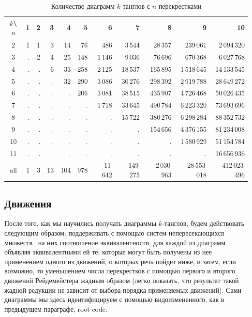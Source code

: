 \documentclass[12pt]{article}
\theoremstyle{plain}
\theoremstyle{definition}
\def\RC{\hbox{root-code}}
\begin{document}
		\begin{table}[ht]
			\caption{Количество диаграмм $k$-танглов с $n$ перекрестками\label{table:tangle-diagrams}}
			\centering
			\begin{tabular}{|c||r|r|r|r|r|r|r|r|r|r|}
			\hline
			$k$\textbackslash $n$
			    & 1 & 2 &  3 &   4 &   5 &       6 &        7 &           8 &            9 &            10 \\
			\hline\hline
			2   & 1 & 1 &  3 &  14 &  76 &     486 &   3\,544 &     28\,357 &     239\,061 &   2\,094\,320 \\
			3   & . & 2 &  4 &  25 & 148 &  1\,146 &   9\,036 &     76\,696 &     670\,368 &   6\,027\,768 \\
			4   & . & . &  6 &  33 & 258 &  2\,125 &  18\,537 &    165\,895 &  1\,518\,645 &  14\,133\,545 \\
			5   & . & . &  . &  32 & 290 &  3\,086 &  30\,276 &    298\,392 &  2\,919\,788 &  28\,649\,272 \\
			6   & . & . &  . &   . & 206 &  3\,081 &  38\,515 &    435\,907 &  4\,726\,468 &  50\,026\,435 \\
			7   & . & . &  . &   . &   . &  1\,718 &  33\,645 &    490\,784 &  6\,223\,320 &  73\,693\,696 \\
			8   & . & . &  . &   . &   . &       . &  15\,722 &    380\,276 &  6\,298\,284 &  88\,352\,732 \\
			9   & . & . &  . &   . &   . &       . &        . &    154\,656 &  4\,376\,155 &  81\,234\,008 \\
			10  & . & . &  . &   . &   . &       . &        . &           . &  1\,580\,929 &  51\,154\,784 \\
			11  & . & . &  . &   . &   . &       . &        . &           . &            . &  16\,656\,936 \\
			\hline
			all & 1 & 3 & 13 & 104 & 978 & 11\,642 & 149\,275 & 2\,030\,963 & 28\,553\,018 & 412\,023\,496 \\
			\hline
			\end{tabular}
		\end{table}

	\subsection{Движения}

		После того, как мы научились получать диаграммы $k$-танглов, будем действовать следующим образом: поддерживать с помощью
		систем непересекающихся множеств~\cite{CormenLeisersonRivestStein2009, Sedgewick1983} на них соотношение эквивалентности, для
		каждой из диаграмм объявляя эквивалентными ей те, которые могут быть получены из нее применением одного из движений, о которых
		речь пойдет ниже, и затем, если возможно, то уменьшением числа перекрестков с помощью первого и второго движений Рейдемейстера
		жадным образом (легко показать, что результат такой жадной редукции не зависит от выбора порядка применяемых движений). Сами
		диаграммы мы здесь идентифицируем с помощью видоизмененного, как в предыдущем параграфе, \RC{}.
\end{document}
